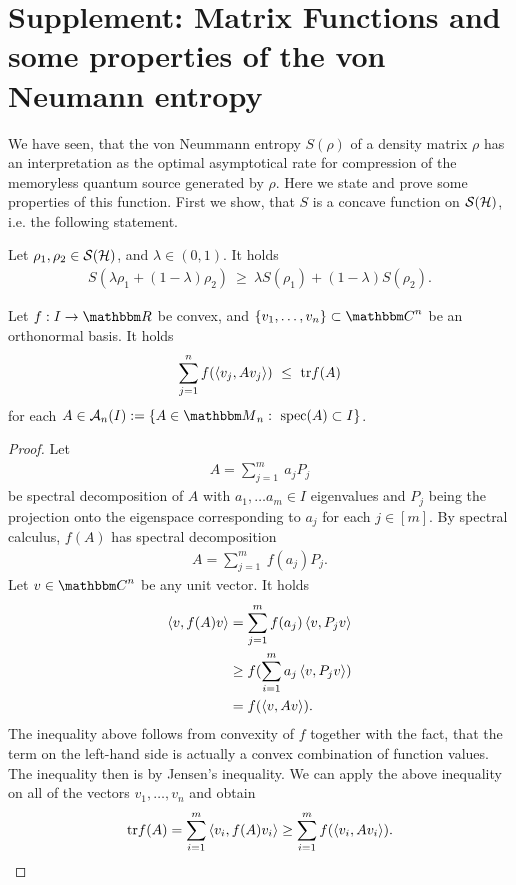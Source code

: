 \section{Supplement: Matrix Functions and some properties of the von Neumann entropy}\label{section:von_neumann_entropy}
We have seen, that the von Neummann entropy $S(\rho)$ of a density matrix $\rho$ has an interpretation as the optimal 
asymptotical rate for compression of the memoryless quantum source generated by $\rho$. Here we state and prove some 
properties of this function.  \newline 
First we show, that $S$ is a concave function on ${\mathcal S}({\mathcal H})$, i.e. the following statement. 
\begin{proposition} \label{prop:von_neumann_concavity} 
 Let $\rho_1, \rho_2 \in {\mathcal S}({\mathcal H})$, and $\lambda \in (0,1)$. It holds
 \begin{align}
  S(\lambda \rho_1 + (1-\lambda) \rho_2)\ \geq \ \lambda S(\rho_1) + (1-\lambda) S(\rho_2).
 \end{align}
\end{proposition}

\begin{proposition}
 Let $f: I \rightarrow \bbmR$ be convex, and $\{v_1,\dots, v_n\} \subset \bbmC^n$ be an orthonormal basis. It 
 holds 
 \begin{align}
  \sum_{j=1}^n f(\braket{v_j, A v_j})  \ \leq \ \mathrm{tr} f(A)    
 \end{align}
 for each $A \in \cA_n(I) := \{A \in \bbmM_{n}: \ \spec(A) \subset I \}$. 
\end{proposition}
\begin{proof}
 Let 
 \begin{align}
  A = \sum_{j=1}^m \ a_j P_j
 \end{align}
 be spectral decomposition of $A$ with $a_1,\dots a_m \in I$ eigenvalues and $P_j$ being the projection onto the eigenspace
 corresponding to $a_j$ for each $j \in [m]$. By spectral calculus, $f(A)$ has spectral
 decomposition
 \begin{align}
  A = \sum_{j=1}^m \ f(a_j) P_j.
 \end{align}
 Let $v \in \bbmC^n$ be any unit vector. It holds
 \begin{align}
  \braket{v, f(A) v}
  &= \sum_{j=1}^m f(a_j) \braket{v, P_j v} \\
  &\geq f(\sum_{i=1}^m a_j \braket{v, P_j v}) \\
  &= f(\braket{v,Av}). 
 \end{align}
 The inequality above follows from convexity of $f$ together with the fact, that the term on the left-hand side is 
 actually a convex combination of function values. The inequality then is by Jensen's inequality. We can apply the 
 above inequality on all of the vectors $v_1,\dots,v_n$ and obtain 
 \begin{align}
  \mathrm{tr} f(A) = \sum_{i=1}^m \braket{v_i, f(A) v_i} \geq \sum_{i=1}^m f(\braket{v_i,A v_i}). 
 \end{align}
 \end{proof}

